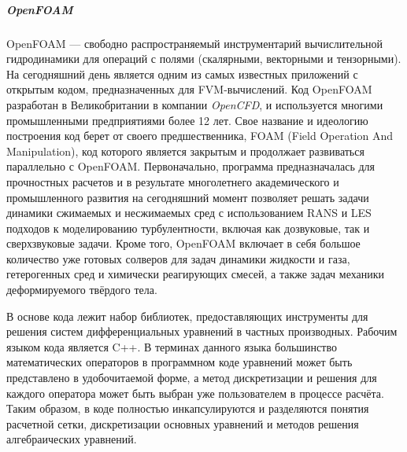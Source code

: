 	\subparagraph{OpenFOAM\\}
		\hspace{2em}OpenFOAM — свободно распространяемый инструментарий вычислительной гидродинамики для операций с полями (скалярными, векторными и тензорными). На сегодняшний день является одним из самых известных приложений с открытым кодом, предназначенных для FVM-вычислений.\cite{openfoam}
		Код OpenFOAM разработан в Великобритании в компании \textit{OpenCFD}, и используется многими промышленными предприятиями более 12 лет. Свое название и идеологию построения код берет от своего предшественника, FOAM (Field Operation And Manipulation), код которого является закрытым и продолжает развиваться параллельно с OpenFOAM. Первоначально, программа предназначалась для прочностных расчетов и в результате многолетнего академического и промышленного развития на сегодняшний момент позволяет решать задачи динамики сжимаемых и несжимаемых сред с использованием RANS и LES подходов к моделированию турбулентности, включая как дозвуковые, так и сверхзвуковые задачи. Кроме того, OpenFOAM включает в себя большое количество уже готовых солверов для задач динамики жидкости и газа, гетерогенных сред и химически реагирующих смесей, а также задач механики деформируемого твёрдого тела.

	В основе кода лежит набор библиотек, предоставляющих инструменты для решения систем дифференциальных уравнений в частных производных. Рабочим языком кода является C++. В терминах данного языка большинство математических операторов в программном коде уравнений может быть представлено в удобочитаемой форме, а метод дискретизации и решения для каждого оператора может быть выбран уже пользователем в процессе расчёта. Таким образом, в коде полностью инкапсулируются и разделяются понятия расчетной сетки, дискретизации основных уравнений и методов решения алгебраических уравнений.
